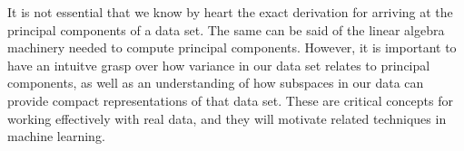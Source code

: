 It is not essential that we know by heart the exact derivation for arriving at the principal components of a data set. The same can be said of the linear algebra machinery needed to compute principal components. However, it is important to have an intuitve grasp over how variance in our data set relates to principal components, as well as an understanding of how subspaces in our data can provide compact representations of that data set. These are critical concepts for working effectively with real data, and they will motivate related techniques in machine learning.
